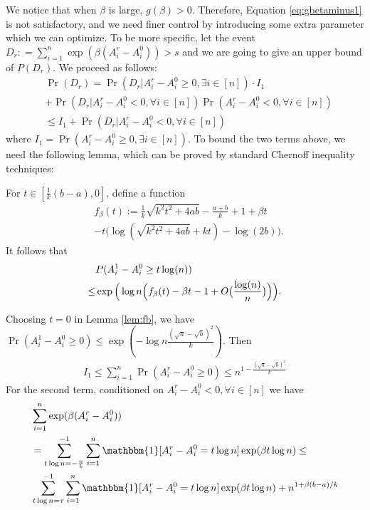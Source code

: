 \documentclass{article}
\begin{document}
We notice that when $\beta$ is large, $g(\beta) > 0$. Therefore, Equation \eqref{eq:gbetaminus1} is not satisfactory, and
we need finer control by introducing some extra parameter which we can optimize. To be more specific, let
the event $D_r : = \sum_{i=1}^n\exp ( \beta(A^r_i-A^0_i)) > s$
and we are going to give an upper bound of $P(D_r)$. We proceed as follows: 
\begin{align*}
&\Pr(D_r) = 
\Pr(D_r| A_i^r - A_i^0 \geq 0, \exists i\in [n])
\cdot I_1 \\
&+ \Pr(D_r | A_i^r - A_i^0  < 0, \forall i\in [n])
\Pr(  A_i^r - A_i^0  < 0 , \forall i \in [n] ) \\
& \leq I_1
+ \Pr(D_r | A_i^r - A_i^0  < 0, \forall i\in [n])
\end{align*}
where $I_1 = \Pr( A_i^r - A_i^0 \geq 0, \exists i\in [n])$.
To bound the two terms above, we need the following lemma, which can be proved by standard Chernoff inequality techniques:
\begin{lemma}\label{lem:fb}
	For $t\in [\frac{1}{k}(b-a), 0]$,
	define a function
	\begin{align*}
	&f_{\beta}(t):=\frac{1}{k}\sqrt{k^2t^2+4ab} -\frac{a+b}{k} +1 +\beta t  \\
	&-t\big(\log(\sqrt{k^2t^2+4ab}+kt)-\log(2b) \big).
	\end{align*}
	It follows that
	\begin{align} 
	& P(A^1_i-A^0_i\ge t\log(n))  \notag\\
	\le &  \exp\Big(\log n \Big(f_{\beta}(t) -\beta t  - 1 + O\big(\frac{\log(n)}{n}\big) \Big)\Big) .
	\end{align}
\end{lemma}
Choosing $t=0$ in Lemma \ref{lem:fb}, we have
$\Pr(A^1_i-A^0_i\ge 0 ) \leq \exp(-\log n \frac{(\sqrt{a}-\sqrt{b})^2}{k})$.
Then
\begin{align*}
I_1 \leq \sum_{i=1}^n \Pr( A_i^r - A_i^0 \geq 0) \leq n^{1-\frac{(\sqrt{a}-\sqrt{b})^2}{k}}
\end{align*}
For the second term,
conditioned on $A_i^r - A_i^0  < 0, \forall i\in [n]$ we have
\begin{align*}
&\sum_{i=1}^n\exp ( \beta(A^r_i-A^0_i)) \\
& = \sum_{t\log n =-\frac{n}{k}}^{-1}\sum_{i=1}^n \mathbbm{1}[A^r_i - A^0_i = t \log n] \exp ( \beta  t\log n)\leq \\ 
&
\sum_{t\log n =\tau}^{-1}\sum_{i=1}^n \mathbbm{1}[A^r_i - A^0_i = t \log n]\exp ( \beta  t\log n) + n^{1+\beta(b-a)/k}
\end{align*}
\end{document}
